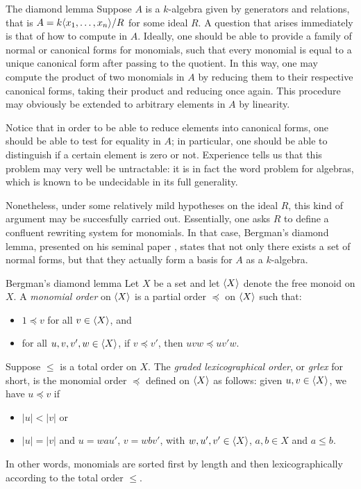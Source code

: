\begin{chapter}{The diamond lemma}
Suppose $A$ is a $k$-algebra given by generators and relations, that is $A=k\langle x_1,\dots,x_n\rangle/R$ for some ideal $R$. A question that arises immediately is that of how to compute in $A$. Ideally, one should be able to provide a family of normal or canonical forms for monomials, such that every monomial is equal to a unique canonical form after passing to the quotient. In this way, one may compute the product of two monomials in $A$ by reducing them to their respective canonical forms, taking their product and reducing once again. This procedure may obviously be extended to arbitrary elements in $A$ by linearity.

Notice that in order to be able to reduce elements into canonical forms, one should be able to test for equality in $A$; in particular, one should be able to distinguish if a certain element is zero or not. Experience tells us that this problem may very well be untractable: it is in fact the word problem for algebras, which is known to be undecidable in its full generality. 

Nonetheless, under some relatively mild hypotheses on the ideal $R$, this kind of argument may be succesfully carried out. Essentially, one asks $R$ to define a confluent rewriting system for monomials. In that case, Bergman's diamond lemma, presented on his seminal paper \cite{Ber78}, states that not only there exists a set of normal forms, but that they actually form a basis for $A$ as a $k$-algebra.

\begin{section}{Bergman's diamond lemma}
 Let $X$ be a set and let $\langle X\rangle$ denote the free monoid on $X$. A \emph{monomial order} on $\langle X\rangle$ is a partial order $\preceq$ on $\langle X\rangle$ such that:
\begin{itemize}
\item $1\preceq v$ for all $v\in \langle X\rangle$, and
\item for all $u,v,v',w\in \langle X\rangle$, if $v\preceq v'$, then $uvw\preceq uv'w$.
\end{itemize}
\begin{exmp} Suppose $\leq$ is a total order on $X$. The \emph{graded lexicographical order}, or \emph{grlex} for short, is the monomial order $\preceq$ defined on $\langle X\rangle$ as follows: given $u,v\in \langle X\rangle$, we have $u\preceq v$ if
\begin{itemize}
\item $|u| < |v|$ or
\item $|u| = |v|$ and $u=wau'$, $v=wbv'$, with $w,u',v'\in \langle X\rangle$, $a,b\in X$ and $a\leq b$.
\end{itemize}
In other words, monomials are sorted first by length and then lexicographically according to the total order $\leq$.
\end{exmp}


\end{section}
\end{chapter}
